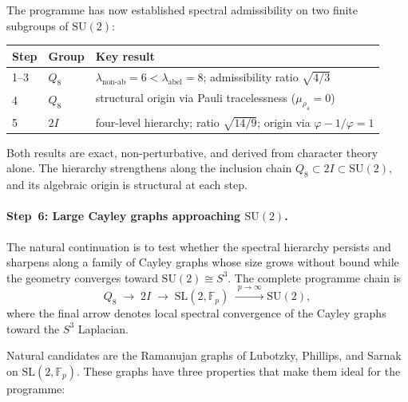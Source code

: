 \documentclass[11pt,a4paper]{article}
\begin{document}
  The programme has now established spectral admissibility on two finite
  subgroups of $\mathrm{SU}(2)$:
  \begin{center}
    \renewcommand{\arraystretch}{1.2}
    \begin{tabular}{lll}
      \hline
      Step & Group & Key result \\
      \hline
      1--3 & $Q_8$ & $\lambda_{\text{non-ab}} = 6 < \lambda_{\text{abel}} = 8$;
      admissibility ratio $\sqrt{4/3}$ \\
      4 & $Q_8$ & structural origin via Pauli tracelessness
      ($\mu_{\rho_4} = 0$) \\
      5 & $2I$ & four-level hierarchy; ratio $\sqrt{14/9}$;
      origin via $\varphi - 1/\varphi = 1$ \\
      \hline
    \end{tabular}
  \end{center}

  Both results are exact, non-perturbative, and derived from character
  theory alone.
  The hierarchy strengthens along the inclusion chain
  $Q_8 \subset 2I \subset \mathrm{SU}(2)$, and its algebraic origin is
  structural at each step.

  \paragraph{Step~6: Large Cayley graphs approaching $\mathrm{SU}(2)$.}

    The natural continuation is to test whether the spectral hierarchy
    persists and sharpens along a family of Cayley graphs whose size grows
    without bound while the geometry converges toward
    $\mathrm{SU}(2) \cong S^3$.
    The complete programme chain is
    \begin{equation}
      Q_8
      \;\longrightarrow\;
      2I
      \;\longrightarrow\;
      \mathrm{SL}(2,\mathbb{F}_p)
      \;\xrightarrow{\;p \to \infty\;}
      \mathrm{SU}(2),
      \label{eq:chain-full}
    \end{equation}
    where the final arrow denotes local spectral convergence of the Cayley
    graphs toward the $S^3$ Laplacian.

    Natural candidates are the Ramanujan graphs of Lubotzky, Phillips, and
    Sarnak~\cite{LPS1988} on $\mathrm{SL}(2,\mathbb{F}_p)$.
    These graphs have three properties that make them ideal for the
    programme:
\end{document}
